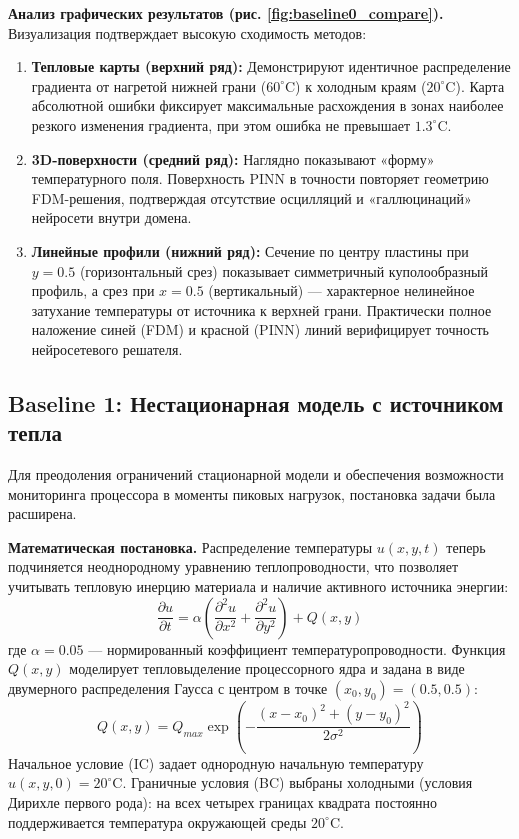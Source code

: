 \documentclass[conference]{IEEEtran}
\begin{document}
\textbf{Анализ графических результатов (рис. \ref{fig:baseline0_compare}).} Визуализация подтверждает высокую сходимость методов:
\begin{enumerate}
    \item \textbf{Тепловые карты (верхний ряд):} Демонстрируют идентичное распределение градиента от нагретой нижней грани ($60^\circ$C) к холодным краям ($20^\circ$C). Карта абсолютной ошибки фиксирует максимальные расхождения в зонах наиболее резкого изменения градиента, при этом ошибка не превышает $1.3^\circ$C.
    \item \textbf{3D-поверхности (средний ряд):} Наглядно показывают «форму» температурного поля. Поверхность PINN в точности повторяет геометрию FDM-решения, подтверждая отсутствие осцилляций и «галлюцинаций» нейросети внутри домена.
    \item \textbf{Линейные профили (нижний ряд):} Сечение по центру пластины при $y=0.5$ (горизонтальный срез) показывает симметричный куполообразный профиль, а срез при $x=0.5$ (вертикальный) — характерное нелинейное затухание температуры от источника к верхней грани. Практически полное наложение синей (FDM) и красной (PINN) линий верифицирует точность нейросетевого решателя.
\end{enumerate}
\subsection{Baseline 1: Нестационарная модель с источником тепла}

Для преодоления ограничений стационарной модели и обеспечения возможности мониторинга процессора в моменты пиковых нагрузок, постановка задачи была расширена. 

\textbf{Математическая постановка.} Распределение температуры $u(x, y, t)$ теперь подчиняется неоднородному уравнению теплопроводности, что позволяет учитывать тепловую инерцию материала и наличие активного источника энергии:
\begin{equation}
    \frac{\partial u}{\partial t} = \alpha \left( \frac{\partial^2 u}{\partial x^2} + \frac{\partial^2 u}{\partial y^2} \right) + Q(x,y)
    \label{eq:baseline1_pde}
\end{equation}
где $\alpha = 0.05$ — нормированный коэффициент температуропроводности. Функция $Q(x,y)$ моделирует тепловыделение процессорного ядра и задана в виде двумерного распределения Гаусса с центром в точке $(x_0, y_0) = (0.5, 0.5)$:
\begin{equation}
    Q(x,y) = Q_{max} \exp\left( -\frac{(x - x_0)^2 + (y - y_0)^2}{2\sigma^2} \right)
\end{equation}
Начальное условие (IC) задает однородную начальную температуру $u(x,y,0) = 20^\circ\text{C}$. Граничные условия (BC) выбраны холодными (условия Дирихле первого рода): на всех четырех границах квадрата постоянно поддерживается температура окружающей среды $20^\circ\text{C}$.
\end{document}

